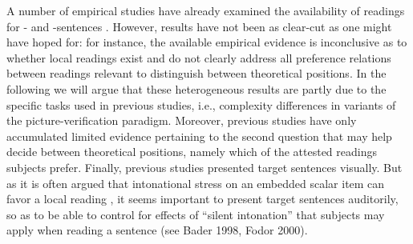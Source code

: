 \documentclass[fleqn,reqno,10pt,draft]{article}
\newcommand{\as}{\acro{as}}
\renewcommand{\es}{\acro{es}}
\begin{document}
A number of empirical studies have already examined the availability
of readings for \as- and \es-sentences
\citep[e.g.][]{GeurtsPouscoulous2009:Embedded-Implic,CliftonDube2010:Embedded-Implic,ChemlaSpector2010:Experimental-Ev}. However,
results have not been as clear-cut as one might have hoped for: for
instance, the available empirical evidence is inconclusive as to
whether local readings exist \citep[see also][for related
discussion]{Tielvan-Tiel2012:Embedded-Scalar} and do not clearly
address all preference relations between readings relevant to
distinguish between theoretical positions. In the following we will
argue that these heterogeneous results are partly due to the specific
tasks used in previous studies, i.e., complexity differences in
variants of the picture-verification paradigm.
Moreover, previous studies have only accumulated limited evidence
pertaining to the second question that may help decide between
theoretical positions, namely which of the attested readings subjects
prefer. Finally, previous studies presented target sentences
visually. But as it is often argued that intonational stress on an
embedded scalar item can favor a local reading
\citep[e.g.][]{Horn2006:The-Border-Wars,Geurts2009:Scalar-Implicat,ChemlaSpector2010:Experimental-Ev,Geurts2010:Quantity-Implic,Tielvan-Tiel2012:Embedded-Scalar},
it seems important to present target sentences auditorily, so as to be
able to control for effects of ``silent intonation'' that subjects may
apply when reading a sentence (see Bader 1998, Fodor 2000).
\end{document}
